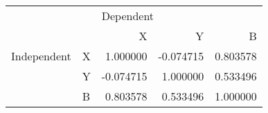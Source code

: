 \begin{tabular}{llrrr}
\toprule
            &   & \multicolumn{3}{l}{Dependent} \\
            &   &         X &         Y &         B \\
\midrule
Independent & X &  1.000000 & -0.074715 &  0.803578 \\
            & Y & -0.074715 &  1.000000 &  0.533496 \\
            & B &  0.803578 &  0.533496 &  1.000000 \\
\bottomrule
\end{tabular}

